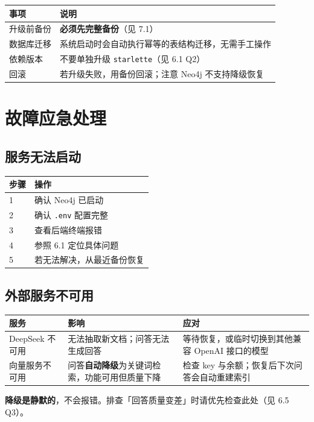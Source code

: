 \documentclass[UTF8,a4paper,11pt]{ctexrep}
\begin{document}
\begin{center}
\small
\begin{tabularx}{\linewidth}{@{}XX@{}}
\toprule
事项 & 说明 \\
\midrule
升级前备份 & \textbf{必须先完整备份}（见 7.1） \\
数据库迁移 & 系统启动时会自动执行幂等的表结构迁移，无需手工操作 \\
依赖版本 & 不要单独升级 \texttt{starlette}（见 6.1 Q2） \\
回滚 & 若升级失败，用备份回滚；注意 Neo4j 不支持降级恢复 \\
\bottomrule
\end{tabularx}
\end{center}

\section{故障应急处理}


\subsection{服务无法启动}

\begin{center}
\small
\begin{tabularx}{\linewidth}{@{}XX@{}}
\toprule
步骤 & 操作 \\
\midrule
1 & 确认 Neo4j 已启动 \\
2 & 确认 \texttt{.env} 配置完整 \\
3 & 查看后端终端报错 \\
4 & 参照 6.1 定位具体问题 \\
5 & 若无法解决，从最近备份恢复 \\
\bottomrule
\end{tabularx}
\end{center}

\subsection{外部服务不可用}

\begin{center}
\small
\begin{tabularx}{\linewidth}{@{}XXX@{}}
\toprule
服务 & 影响 & 应对 \\
\midrule
DeepSeek 不可用 & 无法抽取新文档；问答无法生成回答 & 等待恢复，或临时切换到其他兼容 OpenAI 接口的模型 \\
向量服务不可用 & 问答\textbf{自动降级}为关键词检索，功能可用但质量下降 & 检查 key 与余额；恢复后下次问答会自动重建索引 \\
\bottomrule
\end{tabularx}
\end{center}
\begin{notebox}
\textbf{降级是静默的}，不会报错。排查「回答质量变差」时请优先检查此处（见 6.5 Q3）。

\end{notebox}
\end{document}
